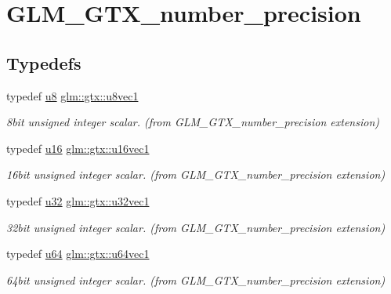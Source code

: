 \hypertarget{group__gtx__number__precision}{}\section{G\+L\+M\+\_\+\+G\+T\+X\+\_\+number\+\_\+precision}
\label{group__gtx__number__precision}
\subsection*{Typedefs}
\begin{DoxyCompactItemize}
\item 
typedef \hyperlink{group__gtc__type__precision_ga5e3dc67373d5068997d2d9f41c9024d2}{u8} \hyperlink{group__gtx__number__precision_ga35ae7849593a354420e4f52d1b36c2d6}{glm\+::gtx\+::u8vec1}
\begin{DoxyCompactList}\small\item\em 8bit unsigned integer scalar. (from G\+L\+M\+\_\+\+G\+T\+X\+\_\+number\+\_\+precision extension) \end{DoxyCompactList}\item 
typedef \hyperlink{group__gtc__type__precision_gae7a1571503f83d2264ddfa705a6b082a}{u16} \hyperlink{group__gtx__number__precision_ga807d7e5f24e981b1575bd40ca159781d}{glm\+::gtx\+::u16vec1}
\begin{DoxyCompactList}\small\item\em 16bit unsigned integer scalar. (from G\+L\+M\+\_\+\+G\+T\+X\+\_\+number\+\_\+precision extension) \end{DoxyCompactList}\item 
typedef \hyperlink{group__gtc__type__precision_ga54e837745059fd29017bed71cfa0a8db}{u32} \hyperlink{group__gtx__number__precision_gac46a7890b20928df83e734c3ea9557d4}{glm\+::gtx\+::u32vec1}
\begin{DoxyCompactList}\small\item\em 32bit unsigned integer scalar. (from G\+L\+M\+\_\+\+G\+T\+X\+\_\+number\+\_\+precision extension) \end{DoxyCompactList}\item 
typedef \hyperlink{group__gtc__type__precision_ga71cedd4972f9cb1a5e14dfe5ab83ecd7}{u64} \hyperlink{group__gtx__number__precision_ga92812a1d7e746bcaba61d2f5a64afc52}{glm\+::gtx\+::u64vec1}
\begin{DoxyCompactList}\small\item\em 64bit unsigned integer scalar. (from G\+L\+M\+\_\+\+G\+T\+X\+\_\+number\+\_\+precision extension) \end{DoxyCompactList}\item 

\end{DoxyCompactItemize}
